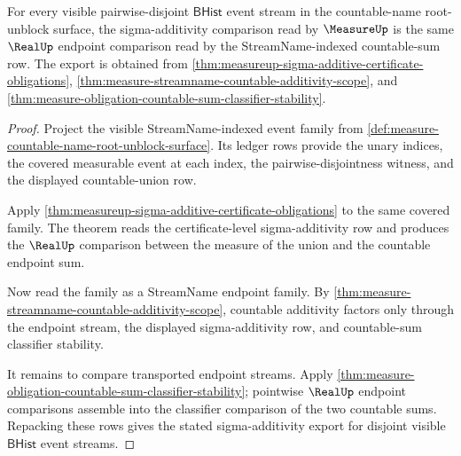 \begin{theorem}
\label{thm:measure-countable-name-sigma-additivity-export}
For every visible pairwise-disjoint $\mathsf{BHist}$ event stream in the
countable-name root-unblock surface, the sigma-additivity comparison read by
$\MeasureUp$ is the same $\RealUp$ endpoint comparison read by the
StreamName-indexed countable-sum row. The export is obtained from
\autoref{thm:measureup-sigma-additive-certificate-obligations},
\autoref{thm:measure-streamname-countable-additivity-scope}, and
\autoref{thm:measure-obligation-countable-sum-classifier-stability}.
\end{theorem}
\begin{proof}
Project the visible StreamName-indexed event family from
\autoref{def:measure-countable-name-root-unblock-surface}. Its ledger rows
provide the unary indices, the covered measurable event at each index, the
pairwise-disjointness witness, and the displayed countable-union row.

Apply \autoref{thm:measureup-sigma-additive-certificate-obligations} to the
same covered family. The theorem reads the certificate-level sigma-additivity
row and produces the $\RealUp$ comparison between the measure of the union and
the countable endpoint sum.

Now read the family as a StreamName endpoint family. By
\autoref{thm:measure-streamname-countable-additivity-scope}, countable
additivity factors only through the endpoint stream, the displayed
sigma-additivity row, and countable-sum classifier stability.

It remains to compare transported endpoint streams. Apply
\autoref{thm:measure-obligation-countable-sum-classifier-stability}; pointwise
$\RealUp$ endpoint comparisons assemble into the classifier comparison of the
two countable sums. Repacking these rows gives the stated sigma-additivity
export for disjoint visible $\mathsf{BHist}$ event streams.
\end{proof}

